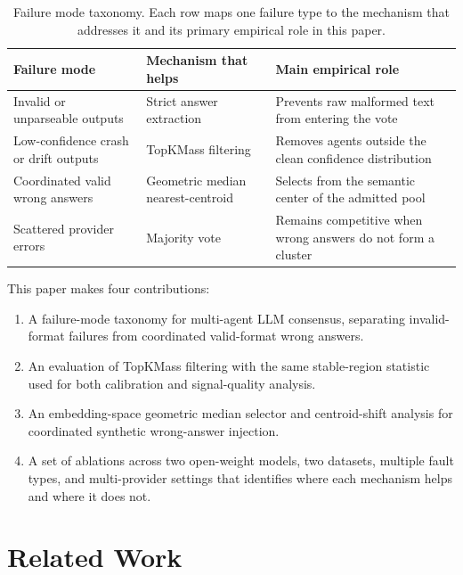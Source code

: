 \documentclass[11pt]{article}
\begin{document}
\begin{table}[h]
\centering
\caption{Failure mode taxonomy. Each row maps one failure type to the mechanism
  that addresses it and its primary empirical role in this paper.}
\label{tab:intro-taxonomy}
\small
\begin{tabular}{p{3.8cm}p{3.5cm}p{5.5cm}}
\toprule
\textbf{Failure mode} & \textbf{Mechanism that helps} & \textbf{Main empirical role} \\
\midrule
Invalid or unparseable outputs
  & Strict answer extraction
  & Prevents raw malformed text from entering the vote \\[4pt]
Low-confidence crash or drift outputs
  & TopKMass filtering
  & Removes agents outside the clean confidence distribution \\[4pt]
Coordinated valid wrong answers
  & Geometric median nearest-centroid
  & Selects from the semantic center of the admitted pool \\[4pt]
Scattered provider errors
  & Majority vote
  & Remains competitive when wrong answers do not form a cluster \\
\bottomrule
\end{tabular}
\end{table}

This paper makes four contributions:
\begin{enumerate}[leftmargin=*, itemsep=2pt]
  \item A failure-mode taxonomy for multi-agent LLM consensus, separating
        invalid-format failures from coordinated valid-format wrong answers.
  \item An evaluation of TopKMass filtering with the same stable-region statistic
        used for both calibration and signal-quality analysis.
  \item An embedding-space geometric median selector and centroid-shift analysis
        for coordinated synthetic wrong-answer injection.
  \item A set of ablations across two open-weight models, two datasets, multiple
        fault types, and multi-provider settings that identifies where each
        mechanism helps and where it does not.
\end{enumerate}

\section{Related Work}
\label{sec:related}
\end{document}
